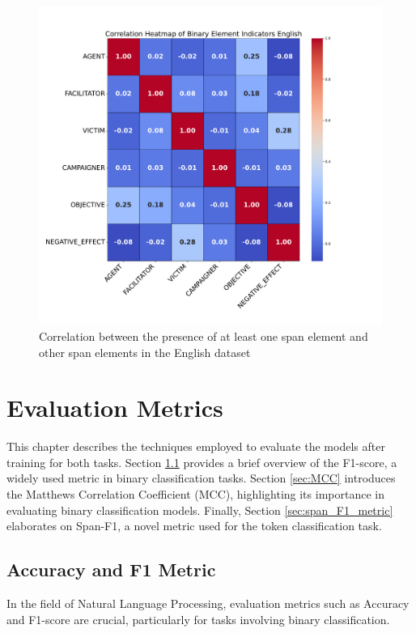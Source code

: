 \documentclass{Configuration_Files/PoliMi3i_thesis}
\begin{document}
\begin{figure}[h] 
    \centering
    \includegraphics[width=1\textwidth]{Images/correlation_heatmap_binary_features_en_v2.pdf} 
    \caption{\small Correlation between the presence of at least one span element and other span elements in the English dataset}
    \label{fig:correlation_heatmap_bin_features_en} 
\end{figure}
\FloatBarrier

\chapter{Evaluation Metrics} \label{chap:eval_metrics}
This chapter describes the techniques employed to evaluate the models after training for both tasks. Section \ref{sec:F1_metric} provides a brief overview of the F1-score, a widely used metric in binary classification tasks. Section \ref{sec:MCC} introduces the Matthews Correlation Coefficient (MCC), highlighting its importance in evaluating binary classification models. Finally, Section \ref{sec:span_F1_metric} elaborates on Span-F1, a novel metric used for the token classification task.

\section{Accuracy and F1 Metric} \label{sec:F1_metric}
In the field of Natural Language Processing, evaluation metrics such as Accuracy and F1-score are crucial, particularly for tasks involving binary classification.
\end{document}
